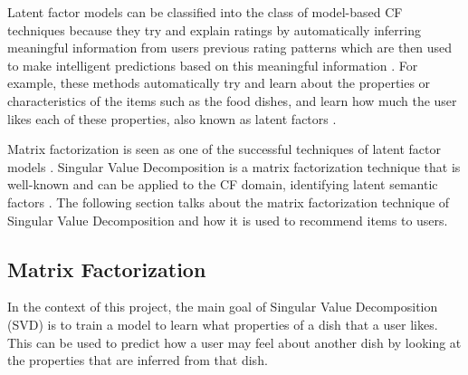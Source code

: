 Latent factor models can be classified into the class of model-based CF techniques because they try and explain ratings by automatically inferring meaningful information from users previous rating patterns which are then used to make intelligent predictions based on this meaningful information \cite{survey}. For example, these methods automatically try and learn about the properties or characteristics of the items such as the food dishes, and learn how much the user likes each of these properties, also known as latent factors \cite{koren2011}. 

Matrix factorization is seen as one of the successful techniques of latent factor models \cite{memorybased, koren2009matrix}. Singular Value Decomposition is a matrix factorization technique that is well-known and can be applied to the CF domain, identifying latent semantic factors \cite{koren2009matrix}. The following section talks about the matrix factorization technique of Singular Value Decomposition and how it is used to recommend items to users. 


\subsection{Matrix Factorization}


In the context of this project, the main goal of Singular Value Decomposition (SVD) is to train a model to learn what properties of a dish that a user likes. This can be used to predict how a user may feel about another dish by looking at the properties that are inferred from that dish.


